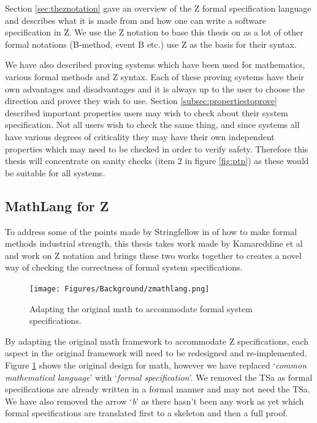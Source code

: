 Section \ref{sec:theznotation} gave an overview of the Z formal specification
language and describes what it is made from and how one can write a software
specification in Z. We use the Z notation to base this thesis on as a lot of
other formal notations (B-method, event B etc.) use Z as the basis for their
syntax.

We have also described proving systems which have been used for mathematics,
various formal methods and Z syntax. Each of these proving systems have their
own advantages and disadvantages and it is always up to the user to choose the
direction and prover they wish to use. Section \ref{subsec:propertiestoprove}
described important properties users may wish to check about their system
specification. Not all users wish to check the same thing, and since  systems
all have various degrees of criticality they may have their own independent
properties which may need to be checked in order to verify safety. Therefore
this thesis will concentrate on sanity checks (item 2 in figure \ref{fig:ptp})
as these would be suitable for all systems.

\subsection{MathLang for Z}

To address some of the points made by Stringfellow in \cite{fmpresetation} of
how to make formal methods industrial strength, this thesis takes work made by
Kamareddine et al \cite{newmathlang} and work on Z notation
\cite{spiveyreferencemanual} and brings these two works together to creates a
novel way of checking the correctness of formal system specifications.

\begin{figure}[H]
\begin{center}
\texttt{[image: Figures/Background/zmathlang.png]}
\end{center}
\caption{Adapting the original \gls{math} to accommodate formal system specifications. \label{fig:zmathlang}}
\end{figure}

By adapting the original \gls{math} framework to accommodate Z specifications,
each aspect in the original framework will need to be redesigned and
re-implemented. Figure \ref{fig:zmathlang} shows the original design for
\gls{math}, however we have replaced `\emph{common mathematical language}' with
`\emph{formal specification}'. We removed the TSa as formal specifications are
already written in a formal manner and may not need the TSa. We have also
removed the arrow `\emph{b}' as there hasn't been any work as yet which formal
specifications are translated first to a skeleton and then a full proof.

